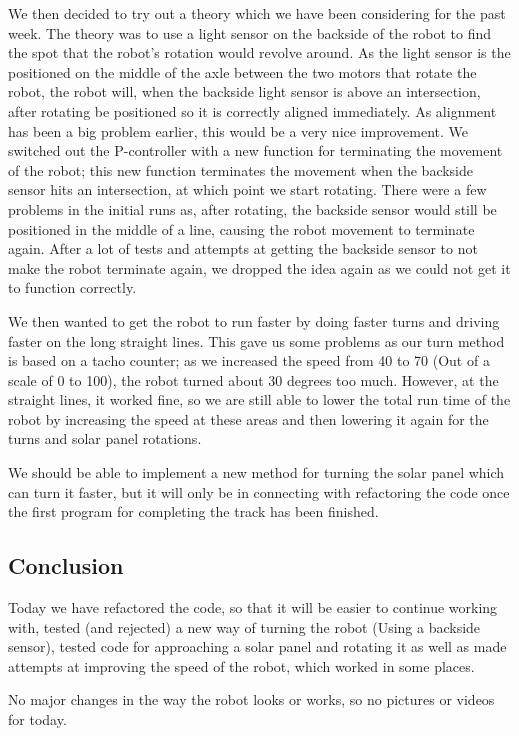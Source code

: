 We then decided to try out a theory which we have been considering for
the past week. The theory was to use a light sensor on the backside of
the robot to find the spot that the robot's rotation would revolve
around. As the light sensor is the positioned on the middle of the axle
between the two motors that rotate the robot, the robot will, when the
backside light sensor is above an intersection, after rotating be
positioned so it is correctly aligned immediately. As alignment has been
a big problem earlier, this would be a very nice improvement. We
switched out the P-controller with a new function for terminating the
movement of the robot; this new function terminates the movement when
the backside sensor hits an intersection, at which point we start
rotating. There were a few problems in the initial runs as, after
rotating, the backside sensor would still be positioned in the middle of
a line, causing the robot movement to terminate again. After a lot of
tests and attempts at getting the backside sensor to not make the robot
terminate again, we dropped the idea again as we could not get it to
function correctly.

We then wanted to get the robot to run faster by doing faster turns and
driving faster on the long straight lines. This gave us some problems as
our turn method is based on a tacho counter; as we increased the speed
from 40 to 70 (Out of a scale of 0 to 100), the robot turned about 30
degrees too much. However, at the straight lines, it worked fine, so we
are still able to lower the total run time of the robot by increasing
the speed at these areas and then lowering it again for the turns and
solar panel rotations.

We should be able to implement a new method for turning the solar panel
which can turn it faster, but it will only be in connecting with
refactoring the code once the first program for completing the track has
been finished.

\subsection{Conclusion}

Today we have refactored the code, so that it will be easier to continue
working with, tested (and rejected) a new way of turning the robot
(Using a backside sensor), tested code for approaching a solar panel and
rotating it as well as made attempts at improving the speed of the
robot, which worked in some places.

No major changes in the way the robot looks or works, so no pictures or
videos for today.
